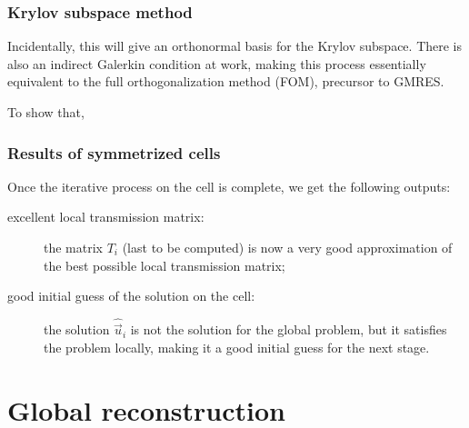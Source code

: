 \documentclass{beamer}
\begin{document}
\begin{frame}
\frametitle{Krylov subspace method}

Incidentally, this will give an orthonormal basis for the Krylov subspace.
There is also an indirect Galerkin condition at work, making this process essentially equivalent to the full orthogonalization method (FOM), precursor to GMRES.

To show that, %

\end{frame}

\begin{frame}
\frametitle{Results of symmetrized cells}

Once the iterative process on the cell is complete, we get the following outputs:
\begin{description}
\item[excellent local transmission matrix:] the matrix $T_i$ (last to be computed) is now a very good approximation of the best possible local transmission matrix;
\item[good initial guess of the solution on the cell:] the solution $\hat{\vec{u}}_i$ is not the solution for the global problem, but it satisfies the problem locally, making it a good initial guess for the next stage.
\end{description}

\end{frame}

\section{Global reconstruction}
\end{document}
